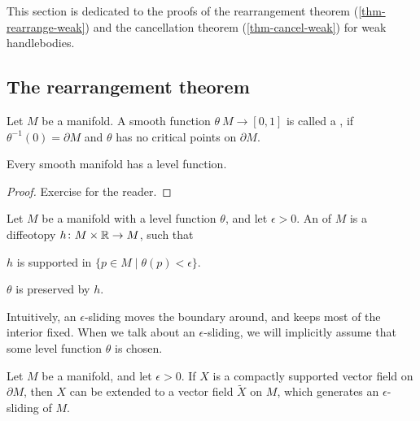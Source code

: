 \label{sec-proofs}

This section is dedicated to the proofs of the
rearrangement theorem (\ref{thm-rearrange-weak}) and
the cancellation theorem (\ref{thm-cancel-weak})
for weak handlebodies.

\subsection{The rearrangement theorem}

\begin{definition}
    Let $M$ be a manifold.
    A smooth function $\theta\:M\to[0,1]$ is called a ,
    if $\theta^{-1}(0)=\partial M$ and $\theta$ has no critical points on $\partial M$. \varqed
\end{definition}

\begin{proposition}
    Every smooth manifold has a level function.
\end{proposition}

\begin{proof}
    Exercise for the reader.
\end{proof}

\begin{definition}
    Let $M$ be a manifold with a level function $\theta$, and let $\epsilon>0$.
    An  of $M$ is a diffeotopy $h\colon M\times\mathbb{R}\to M$, such that
    \begin{enum}
        \item $h$ is supported in $\{p\in M\mid \theta(p)<\epsilon\}$.
        \item $\theta$ is preserved by $h$. \varqed
    \end{enum}
\end{definition}

Intuitively, an $\epsilon$-sliding moves the boundary around,
and keeps most of the interior fixed.
When we talk about an $\epsilon$-sliding,
we will implicitly assume that some level function $\theta$ is chosen.

\begin{lemma}\label{lem:slide}
Let $M$ be a manifold, and let $\epsilon>0$.
If $X$ is a compactly supported vector field on $\partial M$,
then $X$ can be extended to a vector field $\widetilde X$ on $M$,
which generates an $\epsilon$-sliding of $M$.
\end{lemma}

